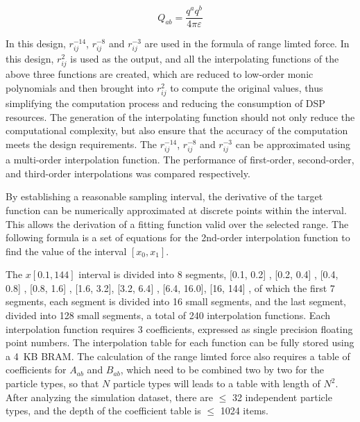 \documentclass{article}
\begin{document}
 
\begin{equation}
    Q_{ab} = \frac{q^a q^b}{4 \pi \varepsilon}
\end{equation}
  
  
In this design, $r_{ij}^{-14}$, $r_{ij}^{-8}$ and $r_{ij}^{-3}$ are used in the formula of 
range limted force. 
In this design, $r_{ij}^2$ is used as the output, and all the interpolating 
functions of the above three functions are created, which are reduced to 
low-order monic polynomials and then brought into $r_{ij}^2$ to compute the 
original values, thus simplifying the computation process and reducing the 
consumption of DSP resources. 
The generation of the interpolating function should not only reduce the 
computational complexity, but also ensure that the accuracy of the computation 
meets the design requirements.
The $r_{ij}^{-14}$, $r_{ij}^{-8}$ and $r_{ij}^{-3}$ can be approximated using a multi-order interpolation function.
The performance of first-order, second-order, and third-order interpolations was compared respectively.



By establishing a reasonable sampling interval, the derivative of the target function can be numerically 
approximated at discrete points within the interval.
 This allows the derivation of a fitting function valid over the selected range.
The following formula is a set of equations for the 2nd-order interpolation 
function to find the value of the interval $[x_{0}, x_{1}]$. 

The $x [0.1, 144]$ interval is divided into 8 segments, {[}0.1, 0.2{]} ,
 {[}0.2, 0.4{]}  ,
 {[}0.4, 0.8{]}  , 
 {[}0.8, 1.6{]} , 
 {[}1.6, 3.2{]},
 {[}3.2, 6.4{]} ,
 {[}6.4, 16.0{]},
 {[}16, 144{]}  , of which the 
first 7 segments, each segment is divided into 16 small segments, and the last 
segment, divided into 128 small segments, a total of 240 interpolation functions.
Each interpolation function requires 3 coefficients, expressed as single 
precision floating point numbers.
The interpolation table for each function can be fully stored using a 4~KB BRAM.
The calculation of the range limted force also requires a table of coefficients 
for $A_{ab}$ and $B_{ab}$, which need to be combined two by two for the particle 
types, %
so that $N$ particle types will leads to a table with length of $N^2$. 
After analyzing the simulation dataset, there are $\leq$ 32 independent 
particle types, and the depth of the coefficient table is $\leq$ 1024 items. 
 
\end{document}
